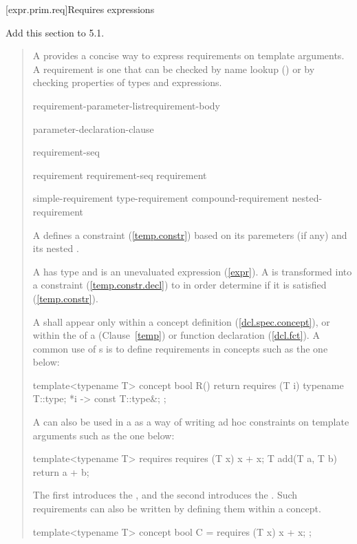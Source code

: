 [expr.prim.req]{Requires expressions}

Add this section to 5.1.

\begin{quote}

\pnum
A  provides a concise way to express 
requirements on template arguments. 
% 
A requirement is one that can be checked by name lookup
() or by checking properties of types and expressions.

\begin{bnf}
\br
     requirement-parameter-list\opt requirement-body

\br
    \terminal{(} parameter-declaration-clause\opt~\terminal{)}
  
\br
    \terminal{\{} requirement-seq \terminal{\}}

\br
    requirement\br
    requirement-seq requirement

\br
    simple-requirement\br
    type-requirement\br
    compound-requirement\br
    nested-requirement
\end{bnf}

\pnum
A  defines a constraint (\ref{temp.constr})
based on its paremeters (if any) and its nested .

\pnum
A  has type  and is an 
unevaluated expression (\ref{expr}).
\enternote
A  is transformed into a constraint 
(\ref{temp.constr.decl}) to in order determine if it is 
satisfied (\ref{temp.constr}).
\exitnote

\pnum
A  shall appear
only within a concept definition (\ref{dcl.spec.concept}),
or within the  of a
(Clause~\ref{temp}) or function declaration (\ref{dcl.fct}).
% 
\enterexample
A common use of s is to define
requirements in concepts such as the one below:
\begin{codeblock}
template<typename T>
  concept bool R() {
    return requires (T i) {
      typename T::type;
      {*i} -> const T::type&;
    };
  }
\end{codeblock}
A  can also be used in a 
 as a way of writing ad hoc 
constraints on template arguments such as the one below:
\begin{codeblock}
template<typename T>
  requires requires (T x) { x + x; }
    T add(T a, T b) { return a + b; }
\end{codeblock}
The first  introduces the 
, and the second
introduces the .
\exitexample
\enternote
Such requirements can also be written by defining them within
a concept.
\begin{codeblock}
template<typename T>
  concept bool C = requires (T x) { x + x; };


\end{codeblock}
\end{quote}

